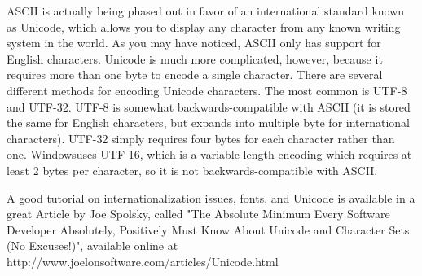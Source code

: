 ASCII is actually being phased out in favor of an international standard
known as Unicode, which allows you to display any character from any known
writing system in the world.  As you may have noticed, ASCII only has support
for English characters.  Unicode is much more complicated, however, because
it requires more than one byte to encode a single character.  There are 
several different methods for encoding Unicode characters.  The most common
is UTF-8 and UTF-32.  UTF-8 is somewhat backwards-compatible with ASCII
(it is stored the same for English characters, but expands into multiple
byte for international characters).  UTF-32 simply requires four bytes for
each character rather than one.  Windows\textregistered uses UTF-16, which is a 
variable-length encoding which requires at least 2 bytes per character, so
it is not backwards-compatible with ASCII.

A good tutorial on internationalization issues, fonts, and Unicode is available
in a great Article by Joe Spolsky, called "The Absolute Minimum Every Software
Developer Absolutely, Positively Must Know About Unicode and Character Sets
(No Excuses!)", available online at http://www.joelonsoftware.com/articles/Unicode.html

